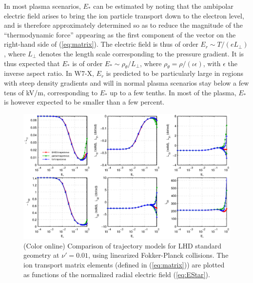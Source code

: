\documentclass[12pt]{revtex4}
\begin{document}
In most plasma scenarios, $E_*$ can be estimated by noting that the
ambipolar electric field arises to bring the ion particle transport
down to the electron level, and is therefore approximately determined so 
as to reduce the magnitude of the ``thermodynamic
force'' appearing as the first component of the vector on the
right-hand side of (\ref{eq:matrix}). The electric field is thus of
order $E_r \sim T/(eL_\perp)$, where $L_\perp$ denotes the length
scale corresponding to the pressure gradient. It is thus expected that $E_*$
is of order $E_* \sim \rho_\theta / L_\perp$, where $\rho_{\theta} =
\rho / (\iota \epsilon)$, with $\epsilon$ the inverse aspect ratio. In
W7-X, $E_r$ is predicted to be particularly large in regions with
steep density gradients and will in normal plasma scenarios stay below
a few tens of kV/m, corresponding to $E_*$ up to a few tenths\cite{Turkin}.
In most of the plasma, $E_*$ is however expected to be smaller than a few percent.




\begin{figure}[h!]
\includegraphics{m20131202_01_plotSFINCSErComparisonForPaper_LHD.eps}
\caption{(Color online) Comparison of trajectory models for LHD standard geometry at $\nu' = 0.01$,
using linearized Fokker-Planck collisions.
The ion transport matrix elements (defined in (\ref{eq:matrix})) are plotted as functions
of the normalized radial electric field (\ref{eq:EStar}).
\label{fig:ErComparison_LHD}}
\end{figure}
\end{document}
